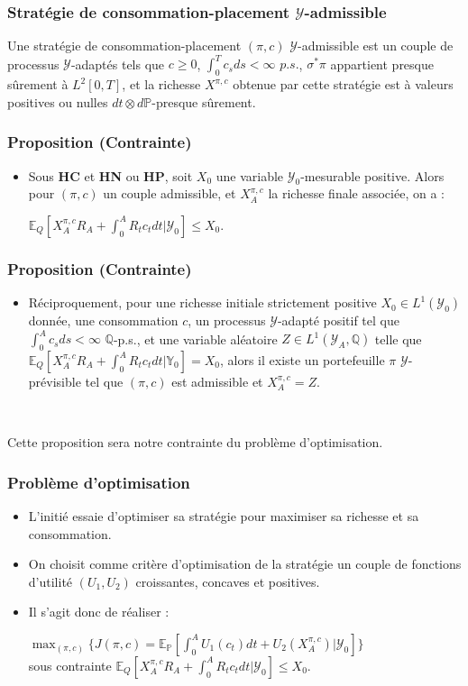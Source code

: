 \documentclass[french]{beamer}
\begin{document}
\begin{frame}
\frametitle{Stratégie de consommation-placement $\mathcal{Y}$-admissible}
Une stratégie de consommation-placement $(\pi, c)$ $\mathcal{Y}$-admissible est un couple de processus $\mathcal{Y}$-adaptés tels que $c\geq 0$, $\int_{0}^{T}c_s ds <\infty$ $p.s.$, ${\sigma}^{*} \pi$ appartient presque sûrement à $L^2[0,T]$, et la richesse $X^{\pi,c}$ obtenue par cette stratégie est à valeurs positives ou nulles $dt \otimes d\mathbb{P}$-presque sûrement.
\end{frame}

\begin{frame}
\frametitle{Proposition (Contrainte)}
\begin{itemize}
\item Sous \textbf{HC} et \textbf{HN} ou \textbf{HP}, soit $X_0$ une variable $\mathcal{Y}_0$-mesurable positive. Alors pour $(\pi, c)$ un couple admissible, et $X^{\pi,c}_A$ la richesse finale associée, on a :
\begin{center}
$\mathbb{E}_Q [X^{\pi,c}_A R_A + \int_{0}^{A} R_t c_t dt | \mathcal{Y}_0] \leq X_0$.
\end{center}
\end{itemize}
\end{frame}

\begin{frame}
\frametitle{Proposition (Contrainte)}
\begin{itemize}
\item Réciproquement, pour une richesse initiale strictement positive $X_0 \in L^1(\mathcal{Y}_0)$ donnée, une consommation $c$, un processus $\mathcal{Y}$-adapté positif tel que $\int_{0}^{A} c_s ds < \infty$ $\mathbb{Q}$-p.s., et une variable aléatoire $Z \in L^1(\mathcal{Y}_A, \mathbb{Q})$ telle que $\mathbb{E}_Q [X^{\pi,c}_A R_A + \int_{0}^{A} R_t c_t dt | \mathbb{Y}_0] = X_0$, alors il existe un portefeuille $\pi$ $\mathcal{Y}$-prévisible tel que $(\pi, c)$ est admissible et $X^{\pi, c}_A = Z$.
\end{itemize}
\

Cette proposition sera notre contrainte du problème d'optimisation.
\end{frame}

\begin{frame}
\frametitle{Problème d'optimisation}
\begin{itemize}
\item L'initié essaie d'optimiser sa stratégie pour maximiser sa richesse et sa consommation.
\item On choisit comme critère d'optimisation de la stratégie un couple de fonctions d'utilité $(U_1, U_2)$ croissantes, concaves et positives. 
\item Il s'agit donc de réaliser : 
\begin{center}
$\displaystyle \max_{(\pi, c)} \{J(\pi, c) = \mathbb{E}_{\mathbb{P}}[\int_{0}^{A} U_1(c_t)dt + U_2(X^{\pi,c}_A) | \mathcal{Y}_0] \}$\\
sous contrainte $\displaystyle \mathbb{E}_Q [X^{\pi,c}_A R_A + \int_{0}^{A} R_t c_t dt | \mathcal{Y}_0] \leq X_0$.
\end{center}
\end{itemize}
\end{frame}
\end{document}
